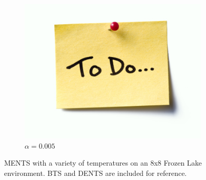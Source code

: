 \begin{figure}
\begin{subfigure}[b]{0.32\textwidth}
                    \centering
                    \includegraphics[width=\textwidth]{figures/todo.jpg}
                    \caption{$\alpha=0.005$}
                \end{subfigure}
                
                \caption{MENTS with a variety of temperatures on an 8x8 Frozen Lake environment. BTS and DENTS are included for reference.}
                \label{fig:fl_param_sens_ments}
            \end{figure}
            
